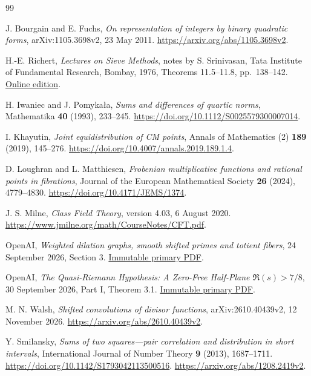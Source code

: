 \begin{thebibliography}{99}\small

J. Bourgain and E. Fuchs,
\emph{On representation of integers by binary quadratic forms},
arXiv:1105.3698v2, 23 May 2011.
\url{https://arxiv.org/abs/1105.3698v2}.

H.-E. Richert,
\emph{Lectures on Sieve Methods}, notes by S. Srinivasan,
Tata Institute of Fundamental Research, Bombay, 1976,
Theorems 11.5--11.8, pp.~138--142.
\href{https://www.math.utoledo.edu/~codenth/Spring_13/3200/NT-books/Lectures_on_Sieve_Methods-Richert.pdf}{Online edition}.

H. Iwaniec and J. Pomyka{\l}a,
\emph{Sums and differences of quartic norms},
Mathematika \textbf{40} (1993), 233--245.
\url{https://doi.org/10.1112/S0025579300007014}.

I. Khayutin,
\emph{Joint equidistribution of CM points},
Annals of Mathematics (2) \textbf{189} (2019), 145--276.
\url{https://doi.org/10.4007/annals.2019.189.1.4}.

D. Loughran and L. Matthiesen,
\emph{Frobenian multiplicative functions and rational points in fibrations},
Journal of the European Mathematical Society \textbf{26} (2024),
4779--4830.
\url{https://doi.org/10.4171/JEMS/1374}.

J. S. Milne,
\emph{Class Field Theory}, version 4.03, 6 August 2020.
\url{https://www.jmilne.org/math/CourseNotes/CFT.pdf}.

OpenAI,
\emph{Weighted dilation graphs, smooth shifted primes and totient fibers},
24 September 2026, Section 3.
\href{https://github.com/openai/math/blob/4eaee87548250b2682affda7d05d947c05554bae/preprints/Weighted-Dilation-Graphs-Smooth-Shifted-Primes-and-Totient-Fibers-September-24-2026/paper.pdf}{Immutable primary PDF}.

OpenAI,
\emph{The Quasi-Riemann Hypothesis:
A Zero-Free Half-Plane \(\Re(s)>7/8\)},
30 September 2026, Part I, Theorem 3.1.
\href{https://github.com/openai/math/blob/4eaee87548250b2682affda7d05d947c05554bae/preprints/The-Quasi-Riemann-Hypothesis-September-30-2026/paper.pdf}{Immutable primary PDF}.

M. N. Walsh,
\emph{Shifted convolutions of divisor functions},
arXiv:2610.40439v2, 12 November 2026.
\url{https://arxiv.org/abs/2610.40439v2}.

Y. Smilansky,
\emph{Sums of two squares---pair correlation and distribution in short intervals},
International Journal of Number Theory \textbf{9} (2013), 1687--1711.
\url{https://doi.org/10.1142/S1793042113500516}.
\url{https://arxiv.org/abs/1208.2419v2}.


\end{thebibliography}
